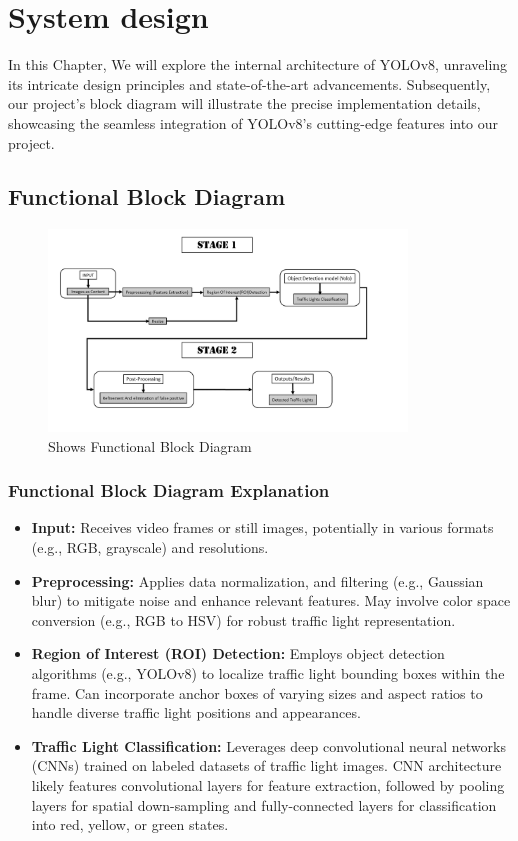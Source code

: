 \documentclass[12 pt]{report}
\begin{document}
\chapter{System design}
In this Chapter, We will explore the internal architecture of YOLOv8, unraveling its intricate design principles and state-of-the-art advancements. Subsequently, our project's block diagram will illustrate the precise implementation details, showcasing the seamless integration of YOLOv8's cutting-edge features into our project.

\section{Functional Block Diagram}
\begin{figure}[h]
  \centering
  \includegraphics[width=0.85\textwidth]{Fun-Diagram.png}
  \caption{Shows Functional Block Diagram}
  \label{fig:function_block_diagram}
\end{figure}
\subsection{Functional Block Diagram Explanation}
{
\begin{itemize}
  \item \textbf{Input:} Receives video frames or still images, potentially in various formats (e.g., RGB, grayscale) and resolutions.
  
  \item \textbf{Preprocessing:} Applies data normalization, and filtering (e.g., Gaussian blur) to mitigate noise and enhance relevant features. May involve color space conversion (e.g., RGB to HSV) for robust traffic light representation.
  
  \item \textbf{Region of Interest (ROI) Detection:} Employs object detection algorithms (e.g., YOLOv8) to localize traffic light bounding boxes within the frame. Can incorporate anchor boxes of varying sizes and aspect ratios to handle diverse traffic light positions and appearances.
  
  \item \textbf{Traffic Light Classification:} Leverages deep convolutional neural networks (CNNs) trained on labeled datasets of traffic light images. CNN architecture likely features convolutional layers for feature extraction, followed by pooling layers for spatial down-sampling and fully-connected layers for classification into red, yellow, or green states.
\end{itemize}
}
\end{document}
